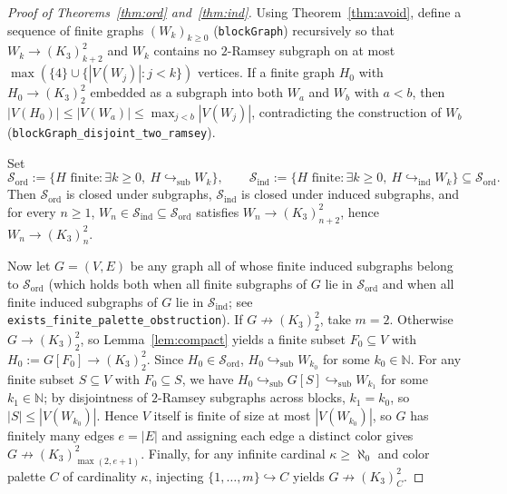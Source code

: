 \documentclass[11pt]{amsart}
\theoremstyle{definition}
\theoremstyle{remark}
\begin{document}
\begin{proof}[Proof of Theorems~\ref{thm:ord} and~\ref{thm:ind}]
Using Theorem~\ref{thm:avoid}, define a sequence of finite graphs $(W_k)_{k \ge 0}$ (\texttt{blockGraph}) recursively so that $W_k \to (K_3)^2_{k+2}$ and $W_k$ contains no $2$-Ramsey subgraph on at most $\max(\{4\} \cup \{|V(W_j)| : j < k\})$ vertices. If a finite graph $H_0$ with $H_0 \to (K_3)^2_2$ embedded as a subgraph into both $W_a$ and $W_b$ with $a < b$, then $|V(H_0)| \le |V(W_a)| \le \max_{j < b} |V(W_j)|$, contradicting the construction of $W_b$ (\texttt{blockGraph\_disjoint\_two\_ramsey}).

Set
\[
  \mathcal{S}_{\mathrm{ord}} := \{H \text{ finite} : \exists k \ge 0,\ H \hookrightarrow_{\mathrm{sub}} W_k\}, \qquad
  \mathcal{S}_{\mathrm{ind}} := \{H \text{ finite} : \exists k \ge 0,\ H \hookrightarrow_{\mathrm{ind}} W_k\} \subseteq \mathcal{S}_{\mathrm{ord}}.
\]
Then $\mathcal{S}_{\mathrm{ord}}$ is closed under subgraphs, $\mathcal{S}_{\mathrm{ind}}$ is closed under induced subgraphs, and for every $n \ge 1$, $W_n \in \mathcal{S}_{\mathrm{ind}} \subseteq \mathcal{S}_{\mathrm{ord}}$ satisfies $W_n \to (K_3)^2_{n+2}$, hence $W_n \to (K_3)^2_n$.

Now let $G = (V, E)$ be any graph all of whose finite induced subgraphs belong to $\mathcal{S}_{\mathrm{ord}}$ (which holds both when all finite subgraphs of $G$ lie in $\mathcal{S}_{\mathrm{ord}}$ and when all finite induced subgraphs of $G$ lie in $\mathcal{S}_{\mathrm{ind}}$; see \texttt{exists\_finite\_palette\_obstruction}). If $G \not\to (K_3)^2_2$, take $m = 2$. Otherwise $G \to (K_3)^2_2$, so Lemma~\ref{lem:compact} yields a finite subset $F_0 \subseteq V$ with $H_0 := G[F_0] \to (K_3)^2_2$. Since $H_0 \in \mathcal{S}_{\mathrm{ord}}$, $H_0 \hookrightarrow_{\mathrm{sub}} W_{k_0}$ for some $k_0 \in \mathbb{N}$. For any finite subset $S \subseteq V$ with $F_0 \subseteq S$, we have $H_0 \hookrightarrow_{\mathrm{sub}} G[S] \hookrightarrow_{\mathrm{sub}} W_{k_1}$ for some $k_1 \in \mathbb{N}$; by disjointness of $2$-Ramsey subgraphs across blocks, $k_1 = k_0$, so $|S| \le |V(W_{k_0})|$. Hence $V$ itself is finite of size at most $|V(W_{k_0})|$, so $G$ has finitely many edges $e = |E|$ and assigning each edge a distinct color gives $G \not\to (K_3)^2_{\max(2, e+1)}$. Finally, for any infinite cardinal $\kappa \ge \aleph_0$ and color palette $C$ of cardinality $\kappa$, injecting $\{1, \dots, m\} \hookrightarrow C$ yields $G \not\to (K_3)^2_C$.
\end{proof}
\end{document}
